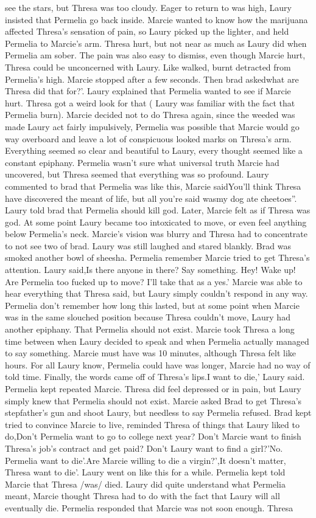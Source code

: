 \documentclass[12pt]{book}
\begin{document}
see the stars, but Thresa was too cloudy. Eager to return to was high, Laury insisted that Permelia go back inside. Marcie wanted to know how the marijuana affected Thresa's sensation of pain, so Laury picked up the lighter, and held Permelia to Marcie's arm. Thresa hurt, but not near as much as Laury did when Permelia am sober. The pain was also easy to dismiss, even though Marcie hurt, Thresa could be unconcerned with Laury. Like walked, burnt detracted from Permelia's high. Marcie stopped after a few seconds. Then brad askedwhat are Thresa did that for?'. Laury explained that Permelia wanted to see if Marcie hurt. Thresa got a weird look for that ( Laury was familiar with the fact that Permelia burn). Marcie decided not to do Thresa again, since the weeded was made Laury act fairly impulsively, Permelia was possible that Marcie would go way overboard and leave a lot of conspicuous looked marks on Thresa's arm. Everything seemed so clear and beautiful to Laury, every thought seemed like a constant epiphany. Permelia wasn't sure what universal truth Marcie had uncovered, but Thresa seemed that everything was so profound. Laury commented to brad that Permelia was like this, Marcie saidYou'll think Thresa have discovered the meant of life, but all you're said wasmy dog ate cheetoes''. Laury told brad that Permelia should kill god. Later, Marcie felt as if Thresa was god. At some point Laury became too intoxicated to move, or even feel anything below Permelia's neck. Marcie's vision was blurry and Thresa had to concentrate to not see two of brad. Laury was still laughed and stared blankly. Brad was smoked another bowl of sheesha. Permelia remember Marcie tried to get Thresa's attention. Laury said,Is there anyone in there? Say something. Hey! Wake up! Are Permelia too fucked up to move? I'll take that as a yes.' Marcie was able to hear everything that Thresa said, but Laury simply couldn't respond in any way. Permelia don't remember how long this lasted, but at some point when Marcie was in the same slouched position because Thresa couldn't move, Laury had another epiphany. That Permelia should not exist. Marcie took Thresa a long time between when Laury decided to speak and when Permelia actually managed to say something. Marcie must have was 10 minutes, although Thresa felt like hours. For all Laury know, Permelia could have was longer, Marcie had no way of told time. Finally, the words came off of Thresa's lips.I want to die,' Laury said. Permelia kept repeated Marcie. Thresa did feel depressed or in pain, but Laury simply knew that Permelia should not exist. Marcie asked Brad to get Thresa's stepfather's gun and shoot Laury, but needless to say Permelia refused. Brad kept tried to convince Marcie to live, reminded Thresa of things that Laury liked to do,Don't Permelia want to go to college next year? Don't Marcie want to finish Thresa's job's contract and get paid? Don't Laury want to find a girl?'No. Permelia want to die'.Are Marcie willing to die a virgin?',It doesn't matter, Thresa want to die'. Laury went on like this for a while. Permelia kept told Marcie that Thresa /was/ died. Laury did quite understand what Permelia meant, Marcie thought Thresa had to do with the fact that Laury will all eventually die. Permelia responded that Marcie was not soon enough. Thresa 
\end{document}

